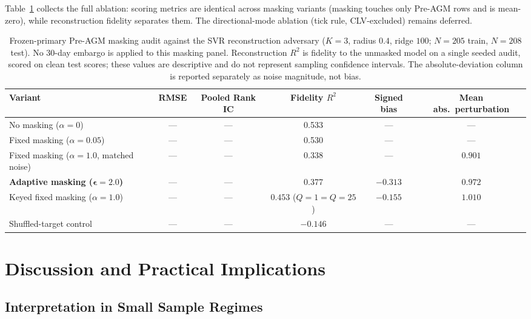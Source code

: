 \documentclass[pdflatex,sn-mathphys-num]{sn-jnl}
\theoremstyle{thmstyleone}
\theoremstyle{thmstyletwo}
\theoremstyle{thmstylethree}
\begin{document}
Table~\ref{tab:ablation} collects the full ablation: scoring metrics are identical across masking variants (masking touches only Pre-AGM rows and is mean-zero), while reconstruction fidelity separates them. The directional-mode ablation (tick rule, CLV-excluded) remains deferred.

\begin{table}[htbp]
\centering
\small
\caption{Frozen-primary Pre-AGM masking audit against the SVR reconstruction adversary ($K=3$, radius $0.4$, ridge $100$; $N=205$ train, $N=208$ test). No 30-day embargo is applied to this masking panel. Reconstruction $R^2$ is fidelity to the unmasked model on a single seeded audit, scored on clean test scores; these values are descriptive and do not represent sampling confidence intervals. The absolute-deviation column is reported separately as noise magnitude, not bias.}
\label{tab:ablation}
\begin{tabular}{@{}lccccc@{}}
\toprule
\textbf{Variant} & \textbf{RMSE} & \textbf{Pooled Rank IC} & \textbf{Fidelity $R^2$} & \textbf{Signed bias} & \textbf{Mean abs.\ perturbation} \\
\midrule
No masking ($\alpha=0$) & --- & --- & 0.533 & --- & --- \\
Fixed masking ($\alpha=0.05$) & --- & --- & 0.530 & --- & --- \\
Fixed masking ($\alpha=1.0$, matched noise) & --- & --- & 0.338 & --- & $0.901$ \\
\textbf{Adaptive masking ($\boldsymbol{\epsilon}=2.0$)} & --- & --- & 0.377 & $\mathbf{-0.313}$ & $\mathbf{0.972}$ \\
Keyed fixed masking ($\alpha=1.0$) & --- & --- & $0.453$ ($Q=1=Q=25$) & $-0.155$ & $1.010$ \\
Shuffled-target control & --- & --- & $-0.146$ & --- & --- \\
\bottomrule
\end{tabular}
\end{table}

\section{Discussion and Practical Implications}\label{sec5}

\subsection{Interpretation in Small Sample Regimes}\label{subsec5_1}
\end{document}
